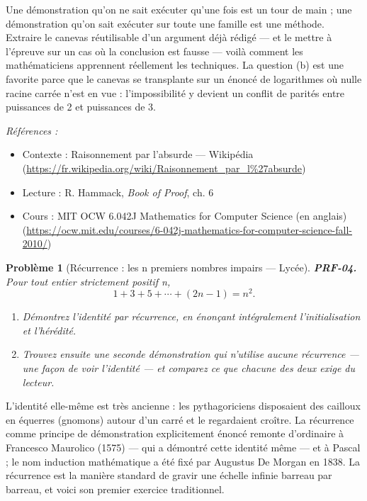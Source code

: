 \documentclass[11pt]{article}
\newtheorem{problem}{Problème}
\newenvironment{refs}{\par\small\noindent\emph{Références :}\begin{itemize}\setlength\itemsep{0pt}}{\end{itemize}\normalsize}
\begin{document}
\noindent Une démonstration qu'on ne sait exécuter qu'une fois est un tour de main ;
une démonstration qu'on sait exécuter sur toute une famille est une méthode. Extraire le
canevas réutilisable d'un argument déjà rédigé --- et le mettre à l'épreuve sur un cas où la
conclusion est fausse --- voilà comment les mathématiciens apprennent réellement les
techniques. La question (b) est une favorite parce que le canevas se transplante sur un
énoncé de logarithmes où nulle racine carrée n'est en vue : l'impossibilité y devient un
conflit de parités entre puissances de 2 et puissances de 3.

\begin{refs}
\item Contexte : Raisonnement par l'absurde --- Wikipédia (\url{https://fr.wikipedia.org/wiki/Raisonnement_par_l%27absurde})
\item Lecture : R. Hammack, \textit{Book of Proof}, ch. 6
\item Cours : MIT OCW 6.042J Mathematics for Computer Science (en anglais) (\url{https://ocw.mit.edu/courses/6-042j-mathematics-for-computer-science-fall-2010/})
\end{refs}

\bigskip

\begin{problem}[{Récurrence : les n premiers nombres impairs --- Lycée}]
\textbf{PRF-04.} Pour tout entier strictement positif n,
\[ 1 + 3 + 5 + \cdots + (2n-1) = n^2 . \]
\begin{enumerate}
\item[(a)] Démontrez l'identité par récurrence, en énonçant intégralement l'initialisation et
l'hérédité.
\item[(b)] Trouvez ensuite une seconde démonstration qui n'utilise aucune récurrence --- une façon
de \textit{voir} l'identité --- et comparez ce que chacune des deux exige du lecteur.
\end{enumerate}

\end{problem}

\noindent L'identité elle-même est très ancienne : les pythagoriciens disposaient des
cailloux en équerres (gnomons) autour d'un carré et le regardaient croître. La récurrence
comme principe de démonstration explicitement énoncé remonte d'ordinaire à Francesco
Maurolico (1575) --- qui a démontré cette identité même --- et à Pascal ; le nom \og{} induction
mathématique \fg{} a été fixé par Augustus De Morgan en 1838. La récurrence est la manière
standard de gravir une échelle infinie barreau par barreau, et voici son premier exercice
traditionnel.
\end{document}
